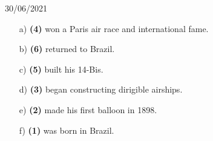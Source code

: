 \documentclass{SchoolBook}
\begin{document}
\begin{day}{30/06/2021}
\begin{enumerate}
            \begin{enumerate}[nosep]
                \item[a)] \textbf{(4)} won a Paris air race and international fame.
                \item[b)] \textbf{(6)} returned to Brazil.
                \item[c)] \textbf{(5)} built his 14-Bis.
                \item[d)] \textbf{(3)} began constructing dirigible airships.
                \item[e)] \textbf{(2)} made his first balloon in 1898.
                \item[f)] \textbf{(1)} was born in Brazil.
            \end{enumerate}
        \end{enumerate}
    \end{day}
    
\end{document}
